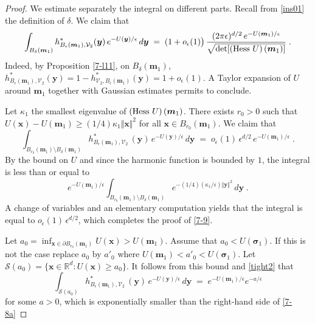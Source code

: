 \documentclass[reqno]{amsart}
\newcounter{as}[section]
\newcommand{\mc}[1]{{\mathcal #1}}
\newcommand{\bb}[1]{{\mathbb #1}}
\newcommand{\bs}[1]{{\boldsymbol #1}}
\newcommand{\<}{\langle}
\renewcommand{\>}{\rangle}
\begin{document}
\begin{proof}
We estimate separately the integral on different parts. Recall from
\eqref{ins01} the definition of $\delta$. We claim that
\begin{equation}
\label{7-8}
\int_{B_\delta(\bs m_1)} h^*_{B_\epsilon(\bs m_1), \mc V_2} (\bs y) \,
e^{-U(\bs y)/\epsilon}\, d\bs y \;=\; (1+o_\epsilon(1)\big) \,
\frac{(2\pi \epsilon)^{d/2}  \, e^{-U(\bs m_1)/\epsilon}}
{\sqrt{\det [(\text{\rm Hess }U)\, (\bs{m}_{1})]}}
\;.
\end{equation}
Indeed, by Proposition \ref{7-l11}, on $B_\delta(\bs m_1)$,
$h^*_{B_\epsilon(\bs m_1), \mc V_2} (\bs y) = 1 -  h^*_{\mc V_2,
  B_\epsilon(\bs m_1)} (\bs y) = 1 + o_\epsilon(1)$. A Taylor
expansion of $U$ around $\bs m_1$ together with Gaussian estimates
permits to conclude.

Let $\kappa_1$ the smallest eigenvalue of $(\text{\rm Hess }U)\,
(\bs{m}_{1})$. There exists $r_0>0$ such that $U(\bs x) - U(\bs m_1)
\ge (1/4) \kappa_1 \Vert \bs x\Vert^2$ for all $\bs x\in B_{r_0}(\bs
m_1)$. We claim that
\begin{equation}
\label{7-9}
\int_{ B_{r_0}(\bs m_1) \setminus B_\delta(\bs m_1)}
h^*_{B_\epsilon(\bs m_1), \mc V_2} \, (\bs y) \,
e^{-U(\bs y)/\epsilon}\, d\bs y \;=\; o_\epsilon(1) \,
\epsilon^{d/2}  \, e^{-U(\bs m_1)/\epsilon}\;.
\end{equation}
By the bound on $U$ and since the harmonic function is bounded by $1$,
the integral is less than or equal to
\begin{equation*}
e^{-U(\bs m_1)/\epsilon} \int_{ B_{r_0}(\bs m_1) \setminus B_\delta(\bs m_1)}
e^{-(1/4) (\kappa_1/\epsilon) \Vert \bs y \Vert^2 }\, d\bs y \;.
\end{equation*}
A change of variables and an elementary computation yields that the
integral is equal to $o_\epsilon(1) \, \epsilon^{d/2}$, which
completes the proof of \eqref{7-9}.

Let $a_0 = \inf_{\bs x\in \partial B_{r_0}(\bs m_1)} U(\bs x) > U(\bs
m_1)$. Assume that $a_0 < U(\bs\sigma_1)$. If this is not the case
replace $a_0$ by $a'_0$ where $U(\bs m_1) < a'_0 < U(\bs
\sigma_1)$. Let $\mc S(a_0)= \{\bs x\in\bb R^d : U(\bs x) \ge a_0\}$. It
follows from this bound and \eqref{tight2} that
\begin{equation}
\label{7-10}
\int_{\mc S(a_0)}
h^*_{B_\epsilon(\bs m_1), \mc V_2} \, (\bs y) \,
e^{-U(\bs y)/\epsilon}\, d\bs y \;=\;
e^{-U(\bs m_1)/\epsilon} e^{-a/\epsilon}
\end{equation}
for some $a>0$, which is exponentially smaller than the right-hand side of \eqref{7-8a}


\end{proof}
\end{document}
